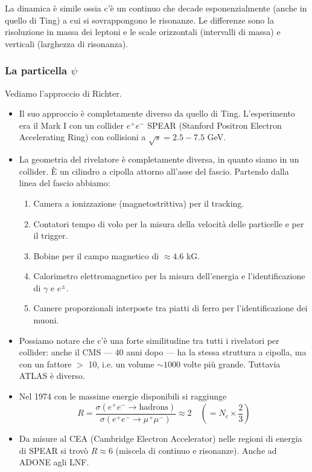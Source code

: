 \begin{itemize}
\begin{figure}[H]
      \end{figure}
      La dinamica è simile ossia c'è un continuo che decade esponenzialmente (anche in quello di Ting) a cui si sovrappongono le risonanze. Le differenze sono la risoluzione in massa dei leptoni e le scale orizzontali (intervalli di massa) e verticali (larghezza di risonanza). 
\end{itemize}
\subsubsection{La particella $\psi$}
Vediamo l'approccio di Richter.
\begin{itemize}
\item Il suo approccio è completamente diverso da quello di Ting. L'esperimento era il Mark I con un collider $e^+e^-$ SPEAR (Stanford Positron Electron Accelerating Ring) con collisioni a $\sqrt s=2.5-7.5$ GeV. 
\item La geometria del rivelatore è completamente diversa, in quanto siamo in un collider. È un cilindro a cipolla attorno all'asse del fascio. Partendo dalla linea del fascio abbiamo:
\begin{enumerate}
\item Camera a ionizzazione (magnetostrittiva) per il tracking.
\item Contatori tempo di volo per la misura della velocità delle particelle e per il trigger.
\item Bobine per il campo magnetico di $\approx4.6$ kG.
\item Calorimetro elettromagnetico per la misura dell'energia e l'identificazione di $\gamma$ e $e^\pm$.
\item Camere proporzionali interposte tra piatti di ferro per l'identificazione dei muoni.
\end{enumerate} 
\item Possiamo notare che c'è una forte similitudine  tra tutti i rivelatori per collider: anche il CMS — 40 anni dopo — ha la stessa struttura a cipolla, ma con un fattore $>$ 10, i.e. un volume $\sim 1000$ volte più grande. Tuttavia ATLAS è diverso. 
\item Nel 1974 con le massime energie disponibili si raggiunge
\begin{equation*}
R=\frac{\sigma(e^+e^-\to\text{hadrons})}{\sigma(e^+e^-\to\mu^+\mu^-)}\approx 2 \quad(=N_c\times\frac23)
\end{equation*}
\item Da misure al CEA (Cambridge Electron Accelerator) nelle regioni di energia di SPEAR si trovò $R\approx6$ (miscela di continuo e risonanze). Anche ad ADONE agli LNF.

\end{itemize}
